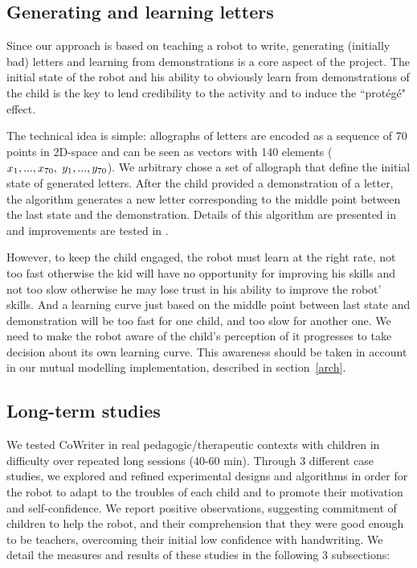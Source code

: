 \documentclass[10pt,a4paper]{article}
\begin{document}
\subsection{Generating and learning letters}

Since our approach is based on teaching a robot to write, generating (initially
bad) letters and learning from demonstrations is a core aspect of the project.
The initial state of the robot and his ability to obviously learn from demonstrations of the child is the key to lend credibility to the activity and to induce the ``prot\'eg\'e" effect.

The technical idea is simple: allographs of letters are encoded as a sequence of 70 points in
2D-space and can be seen as vectors with 140 elements
($x_1,...,x_{70},\hspace{1mm}y_1,...,y_{70}$). We arbitrary chose a set of allograph
that define the initial state of generated letters. 
After the child provided a demonstration of a letter, the algorithm
generates a new letter corresponding to the middle point between the last state and the
demonstration. Details of this algorithm are presented in \cite{Hood} and improvements are tested in \cite{jacq2016building}.

However, to keep the child engaged, the robot must learn at the right rate, not too fast otherwise the kid will have
no opportunity for improving his skills and not too slow otherwise he may lose
trust in his ability to improve the robot' skills. And a learning curve just based on the middle point between last state and demonstration will be too fast for one child, and too slow for another one. We need to make the robot aware of the child's perception of it progresses to take decision about its own learning curve. This awareness should be taken in account in our mutual modelling implementation, described in section~\ref{arch}. 

\subsection{Long-term studies}\label{long}
We tested CoWriter in real pedagogic/therapeutic contexts with
children in difficulty over repeated long sessions (40-60 min). Through 3 different
case studies, we explored and refined experimental designs and algorithms in
order for the robot to adapt to the
troubles of each child and to promote their motivation and self-confidence. We report positive observations, suggesting commitment of children to help the
robot, and their comprehension that they were good enough to be teachers,
overcoming their initial low confidence with handwriting. We detail the measures and results of these studies in the following 3 subsections:
\end{document}
